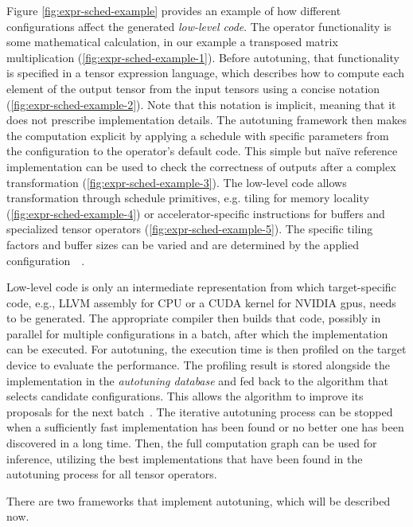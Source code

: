Figure \ref{fig:expr-sched-example} provides an example of how different configurations affect the generated \textit{low-level code}. The operator functionality is some mathematical calculation, in our example a transposed matrix multiplication (\ref{fig:expr-sched-example-1}). Before autotuning, that functionality is specified in a tensor expression language, which describes how to compute each element of the output tensor from the input tensors using a concise notation (\ref{fig:expr-sched-example-2}). Note that this notation is implicit, meaning that it does not prescribe implementation details. The autotuning framework then makes the computation explicit by applying a schedule with specific parameters from the configuration to the operator's default code. This simple but naïve reference implementation can be used to check the correctness of outputs after a complex transformation (\ref{fig:expr-sched-example-3}). The low-level code allows transformation through schedule primitives, e.g. tiling for memory locality (\ref{fig:expr-sched-example-4}) or accelerator-specific instructions for buffers and specialized tensor operators (\ref{fig:expr-sched-example-5}). The specific tiling factors and buffer sizes can be varied and are determined by the applied configuration~\cite[p.~4~ff.]{Chen.2018b}~\cite[p.~9~ff.]{Vasilache.2018}.

Low-level code is only an intermediate representation from which target-specific code, e.g., LLVM assembly for CPU or a CUDA kernel for NVIDIA \glspl{gpu}, needs to be generated. The appropriate compiler then builds that code, possibly in parallel for multiple configurations in a batch, after which the implementation can be executed. For autotuning, the execution time is then profiled on the target device to evaluate the performance. The profiling result is stored alongside the implementation in the \textit{autotuning database} and fed back to the algorithm that selects candidate configurations. This allows the algorithm to improve its proposals for the next batch~\cite[p.~15~f.]{Vasilache.2018}. The iterative autotuning process can be stopped when a sufficiently fast implementation has been found or no better one has been discovered in a long time. Then, the full computation graph can be used for inference, utilizing the best implementations that have been found in the autotuning process for all tensor operators.

There are two frameworks that implement autotuning, which will be described now.

